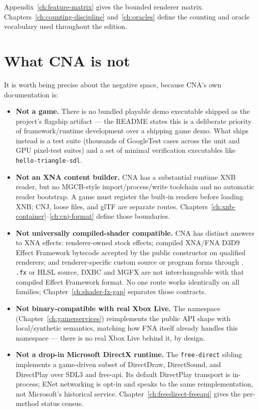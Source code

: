 Appendix~\ref{ch:feature-matrix} gives the bounded renderer matrix.  Chapters~\ref{ch:counting-discipline}
and~\ref{ch:oracles} define the counting and oracle vocabulary used throughout the edition.

\section{What CNA is not}

It is worth being precise about the negative space, because CNA's own documentation is:

\begin{itemize}
  \item \textbf{Not a game.} There is no bundled playable demo executable shipped as the
        project's flagship artifact --- the README states this is a deliberate priority of
        framework/runtime development over a shipping game demo. What ships instead is a
        test suite (thousands of GoogleTest cases across the unit and GPU pixel-test suites)
        and a set of minimal verification executables like \texttt{hello-triangle-sdl}.
  \item \textbf{Not an XNA content builder.} CNA has a substantial runtime XNB reader, but no
        MGCB-style import/process/write toolchain and no automatic reader bootstrap. A game must
        register the built-in readers before loading XNB; CNJ, loose files, and glTF are separate
        routes. Chapters~\ref{ch:xnb-container}--\ref{ch:cnj-format} define those boundaries.
  \item \textbf{Not universally compiled-shader compatible.} CNA has distinct answers to
        XNA effects: renderer-owned stock effects; compiled XNA/FNA D3D9 Effect Framework bytecode
        accepted by the public  constructor on qualified renderers; and
        renderer-specific custom source or program forms through .
        \texttt{.fx} or HLSL source, DXBC and MGFX are not interchangeable with that compiled
        Effect Framework format. No one route works identically on all \RendererFamilyCount{} families;
        Chapter~\ref{ch:shader-fx-gap}
        separates those contracts.
  \item \textbf{Not binary-compatible with real Xbox Live.} The 
        namespace (Chapter~\ref{ch:gamerservices}) reimplements the public API shape with
        local/synthetic semantics, matching how FNA itself already handles this namespace ---
        there is no real Xbox Live behind it, by design.
  \item \textbf{Not a drop-in Microsoft DirectX runtime.} The \texttt{free-direct} sibling
        implements a game-driven subset of DirectDraw, DirectSound, and DirectPlay over SDL3 and
        free-api. Its default DirectPlay transport is in-process; ENet networking is opt-in and
        speaks to the same reimplementation, not Microsoft's historical service. Chapter~\ref{ch:freedirect-freeapi}
        gives the per-method status census.
\end{itemize}

